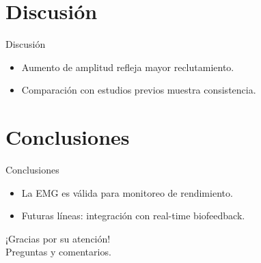 \documentclass[12pt]{beamer}
\begin{document}
\section{Discusión}
\begin{frame}{Discusión}
    \begin{itemize}
        \item Aumento de amplitud refleja mayor reclutamiento.
        \item Comparación con estudios previos muestra consistencia.
    \end{itemize}
\end{frame}

\section{Conclusiones}
\begin{frame}{Conclusiones}
    \begin{itemize}
        \item La EMG es válida para monitoreo de rendimiento.
        \item Futuras líneas: integración con real-time biofeedback.
    \end{itemize}
\end{frame}

\begin{frame}[plain]
    \centering
    \Huge ¡Gracias por su atención!\\[1cm]
    \small Preguntas y comentarios.
\end{frame}
\end{document}

